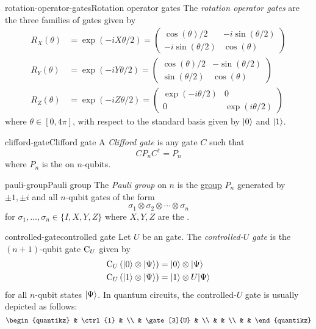 \begin{topic}{rotation-operator-gates}{Rotation operator gates}
    The \emph{rotation operator gates} are the three families of  gates given by
    \[ \begin{aligned}
        R_X(\theta) &= \exp(-i X \theta / 2) =  \begin{pmatrix} \cos(\theta) / 2 & - i \sin(\theta / 2) \\ - i \sin(\theta / 2) & \cos(\theta) \end{pmatrix} \\[15pt]
        R_Y(\theta) &= \exp(-i Y \theta / 2) =  \begin{pmatrix} \cos(\theta) / 2 & - \sin(\theta / 2) \\ \sin(\theta / 2) & \cos(\theta) \end{pmatrix} \\[15pt]
        R_Z(\theta) &= \exp(-i Z \theta / 2) =  \begin{pmatrix} \exp(-i \theta / 2) & 0 \\ 0 & \exp(i \theta / 2) \end{pmatrix}
    \end{aligned} \]
    where $\theta \in [0, 4\pi]$, with respect to the standard basis given by $|0\rangle$ and $|1\rangle$.
\end{topic}

\begin{topic}{clifford-gate}{Clifford gate}
    A \emph{Clifford gate} is any  gate $C$ such that
    \[ C P_n C^\dagger = P_n \]
    where $P_n$ is the  on $n$-qubits.
\end{topic}

\begin{topic}{pauli-group}{Pauli group}
    The \emph{Pauli group} on $n$  is the \href{/math-definitions/#GT:group}{group} $P_n$ generated by $\pm 1, \pm i$ and all $n$-qubit gates of the form
    \[ \sigma_1 \otimes \sigma_2 \otimes \cdots \otimes \sigma_n \]
    for $\sigma_1, \ldots, \sigma_n \in \{ I, X, Y, Z \}$ where $X, Y, Z$ are the .
\end{topic}

\begin{topic}{controlled-gate}{controlled gate}
    Let $U$ be an  gate. The \emph{controlled-$U$ gate} is the $(n + 1)$-qubit gate $\textup{C}_U$ given by
    \[ \begin{aligned}
        \textup{C}_U \left( |0\rangle \otimes |\Psi\rangle \right) &= |0\rangle \otimes |\Psi\rangle \\
        \textup{C}_U \left( |1\rangle \otimes |\Psi\rangle \right) &= |1\rangle \otimes U |\Psi\rangle
    \end{aligned} \]
    for all $n$-qubit states $|\Psi\rangle$. In quantum circuits, the controlled-$U$ gate is usually depicted as follows:
    \[ \svg \begin{quantikz}
        & \ctrl{1} & \\
        & \gate[3]{U} & \\
        & & \\
        & &
    \end{quantikz} \]
\end{topic}
